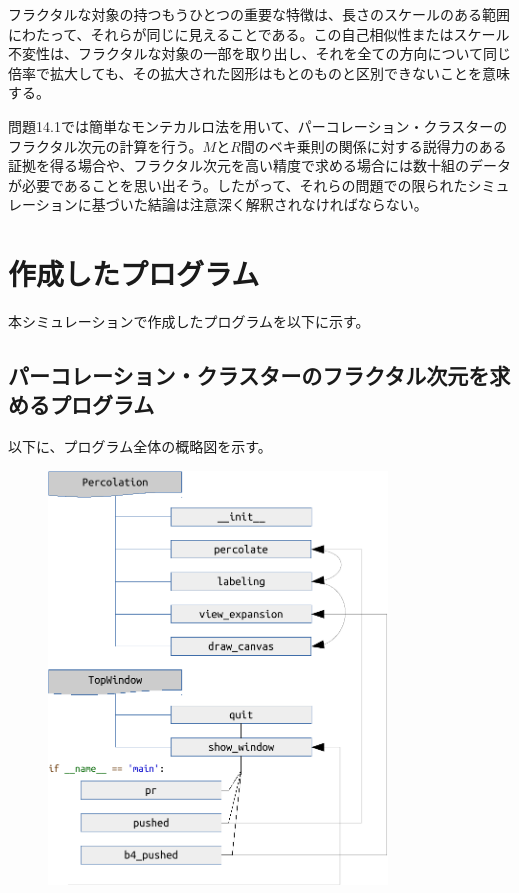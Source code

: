 \documentclass{jsarticle}
\begin{document}
        フラクタルな対象の持つもうひとつの重要な特徴は、長さのスケールのある範囲にわたって、それらが同じに見えることである。この自己相似性またはスケール不変性は、フラクタルな対象の一部を取り出し、それを全ての方向について同じ倍率で拡大しても、その拡大された図形はもとのものと区別できないことを意味する。
        
        問題14.1では簡単なモンテカルロ法を用いて、パーコレーション・クラスターのフラクタル次元の計算を行う。$M$と$R$間のベキ乗則の関係に対する説得力のある証拠を得る場合や、フラクタル次元を高い精度で求める場合には数十組のデータが必要であることを思い出そう。したがって、それらの問題での限られたシミュレーションに基づいた結論は注意深く解釈されなければならない。
        
    \section{作成したプログラム}
        本シミュレーションで作成したプログラムを以下に示す。
        
        \subsection{パーコレーション・クラスターのフラクタル次元を求めるプログラム}
        
        以下に、プログラム全体の概略図を示す。
        
        \begin{figure}[H]
            \begin{center}
                \includegraphics[width=9cm]{flow.pdf}
            \end{center}

        \end{figure}
\end{document}
